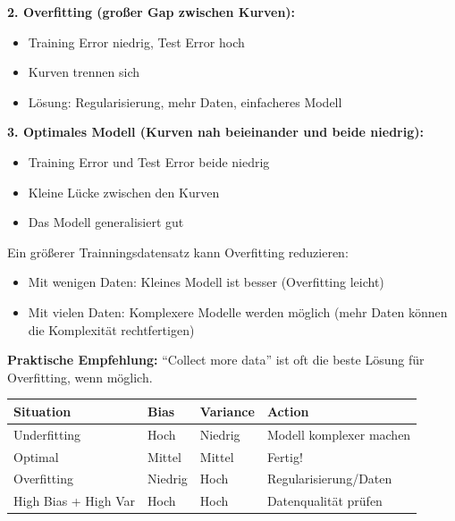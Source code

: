 \textbf{2. Overfitting (großer Gap zwischen Kurven):}
\begin{itemize}[leftmargin=1.5em]
    \item Training Error niedrig, Test Error hoch
    \item Kurven trennen sich
    \item Lösung: Regularisierung, mehr Daten, einfacheres Modell
\end{itemize}

\textbf{3. Optimales Modell (Kurven nah beieinander und beide niedrig):}
\begin{itemize}[leftmargin=1.5em]
    \item Training Error und Test Error beide niedrig
    \item Kleine Lücke zwischen den Kurven
    \item Das Modell generalisiert gut
\end{itemize}

Ein größerer Trainningsdatensatz kann Overfitting reduzieren:
\begin{itemize}[leftmargin=1.5em]
    \item Mit wenigen Daten: Kleines Modell ist besser (Overfitting leicht)
    \item Mit vielen Daten: Komplexere Modelle werden möglich (mehr Daten können die Komplexität rechtfertigen)
\end{itemize}

\textbf{Praktische Empfehlung:} ``Collect more data'' ist oft die beste Lösung für Overfitting, wenn möglich.


\begin{table}[h]
    \centering
    \small
    \begin{tabular}{|l|l|l|l|}
        \hline
        \textbf{Situation} & \textbf{Bias} & \textbf{Variance} & \textbf{Action} \\
        \hline
        Underfitting & Hoch & Niedrig & Modell komplexer machen \\
        \hline
        Optimal & Mittel & Mittel & Fertig! \\
        \hline
        Overfitting & Niedrig & Hoch & Regularisierung/Daten \\
        \hline
        High Bias + High Var & Hoch & Hoch & Datenqualität prüfen \\
        \hline
    \end{tabular}
\end{table}

